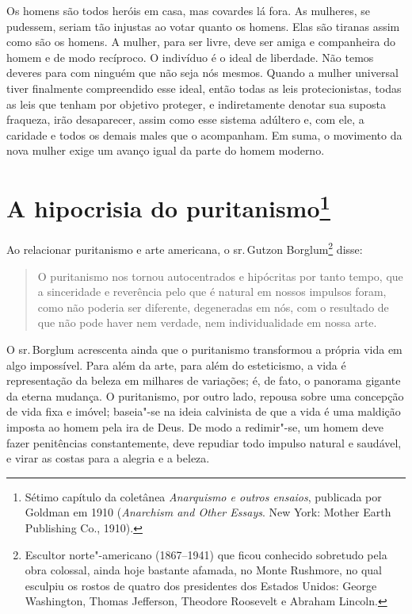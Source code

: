 Os homens são todos heróis em casa, mas covardes lá fora. As mulheres,
se pudessem, seriam tão injustas ao votar quanto os homens. Elas são tiranas assim como são os homens. A mulher, para ser livre, deve ser amiga e companheira do homem e de modo
recíproco. O indivíduo é o ideal de liberdade. Não temos deveres para com ninguém que não seja nós mesmos.
Quando a mulher universal tiver finalmente compreendido esse ideal,
então todas as leis protecionistas, todas as leis que tenham por objetivo
proteger, e indiretamente denotar sua suposta fraqueza, irão
desaparecer, assim como esse sistema adúltero e, com ele, a caridade e
todos os demais males que o acompanham. Em suma, o movimento da nova
mulher exige um avanço igual da parte do homem moderno.


\chapter{A hipocrisia do puritanismo\footnote{Sétimo capítulo da coletânea
  \emph{Anarquismo e outros ensaios}, publicada por Goldman em 1910
  (\emph{Anarchism and Other Essays}. New York: Mother Earth Publishing
  Co., 1910).}}

Ao relacionar puritanismo e arte americana, o sr.\,Gutzon Borglum\footnote{Escultor norte"-americano (1867--1941) que ficou conhecido sobretudo pela obra colossal, ainda hoje bastante afamada, no Monte Rushmore, no qual esculpiu os rostos de quatro dos presidentes dos Estados Unidos: George Washington, Thomas Jefferson, Theodore Roosevelt e Abraham Lincoln.} disse:

\begin{quote}
O puritanismo nos tornou autocentrados e hipócritas por tanto tempo,
que a sinceridade e reverência pelo que é natural em nossos impulsos
foram, como não poderia ser diferente, degeneradas em nós, com o
resultado de que não pode haver nem verdade, nem individualidade em
nossa arte.
\end{quote}

O sr.\,Borglum acrescenta ainda que o puritanismo transformou a própria vida
em algo impossível. Para além da arte, para além do esteticismo, a vida
é representação da beleza em milhares de variações; é, de fato, o
panorama gigante da eterna mudança. O puritanismo, por outro lado,
repousa sobre uma concepção de vida fixa e imóvel; baseia"-se na ideia
calvinista de que a vida é uma maldição imposta ao homem pela ira de
Deus. De modo a redimir"-se, um homem deve fazer penitências
constantemente, deve repudiar todo impulso natural e saudável, e virar
as costas para a alegria e a beleza.

